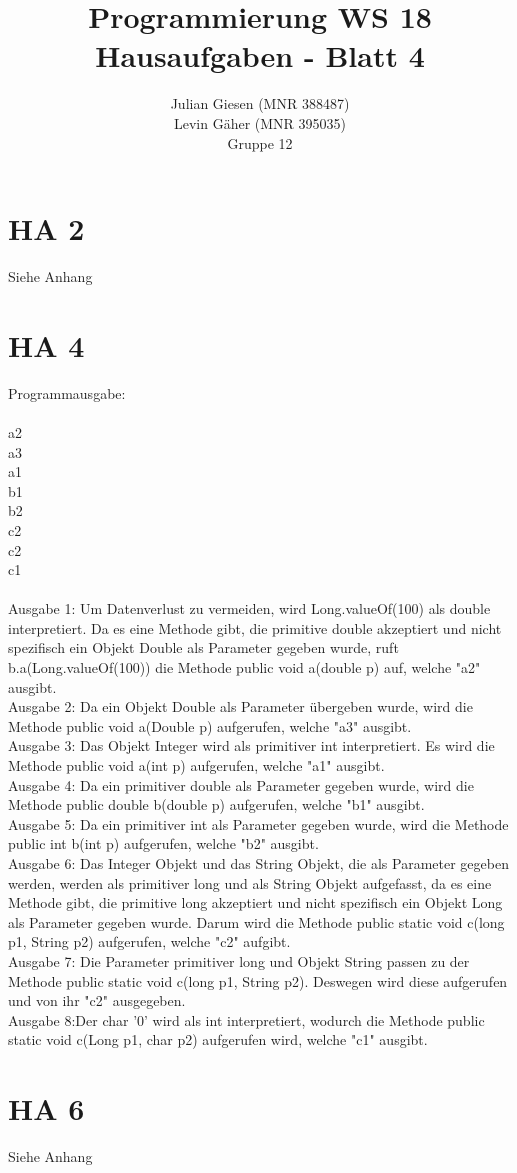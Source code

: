 \documentclass[a4paper]{article}
\title{ Programmierung WS 18 \\ Hausaufgaben - Blatt 4 }
\author{ Julian Giesen (MNR 388487) \\
Levin Gäher (MNR 395035) \\
Gruppe 12 }
\date{  }
\begin{document}
\maketitle

\section*{ HA 2 }
Siehe Anhang



\section*{ HA 4 }

Programmausgabe:\\
\\
a2\\
a3\\
a1\\
b1\\
b2\\
c2\\
c2\\
c1\\
\\
Ausgabe 1: Um Datenverlust zu vermeiden, wird Long.valueOf(100) als double interpretiert. Da es eine Methode gibt, die primitive double akzeptiert und nicht spezifisch ein Objekt Double als Parameter gegeben wurde, ruft b.a(Long.valueOf(100)) die Methode public void a(double p) auf, welche "a2" ausgibt.\\
Ausgabe 2: Da ein Objekt Double als Parameter übergeben wurde, wird die Methode public void a(Double p) aufgerufen, welche "a3" ausgibt.\\
Ausgabe 3: Das Objekt Integer wird als primitiver int interpretiert. Es wird die Methode public void a(int p) aufgerufen, welche "a1" ausgibt. \\
Ausgabe 4: Da ein primitiver double als Parameter gegeben wurde, wird die Methode public double b(double p) aufgerufen, welche "b1" ausgibt. \\
Ausgabe 5: Da ein primitiver int als Parameter gegeben wurde, wird die Methode public int b(int p) aufgerufen, welche "b2" ausgibt. \\
Ausgabe 6: Das Integer Objekt und das String Objekt, die als Parameter gegeben werden, werden als primitiver long und als String Objekt aufgefasst, da es eine Methode gibt, die primitive long akzeptiert und nicht spezifisch ein Objekt Long als Parameter gegeben wurde. Darum wird die Methode public static void c(long p1, String p2) aufgerufen, welche "c2" aufgibt.\\
Ausgabe 7: Die Parameter primitiver long und Objekt String passen zu der Methode public static void c(long p1, String p2). Deswegen wird diese aufgerufen und von ihr "c2" ausgegeben.\\
Ausgabe 8:Der char ’0’ wird als int interpretiert, wodurch die Methode public static void c(Long p1, char p2) aufgerufen wird, welche "c1" ausgibt.\\


\section*{ HA 6 }



Siehe Anhang
\end{document}
